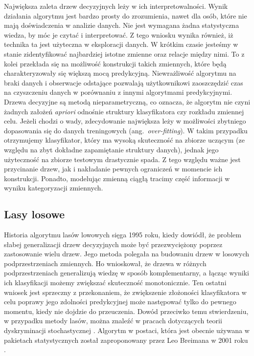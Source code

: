 \documentclass[12pt,a4paper,twoside,openany]{book}
\begin{document}
Największa zaleta drzew decyzyjnych leży w ich interpretowalności. Wynik działania algorytmu jest bardzo prosty do zrozumienia, nawet dla osób, które nie mają doświadczenia w analizie danych. Nie jest wymagana żadna statystyczna wiedza, by móc je czytać i interpretować. Z tego wniosku wynika również, iż technika ta jest użyteczna w eksploracji danych. W krótkim czasie jesteśmy w stanie zidentyfikować najbardziej istotne zmienne oraz relacje między nimi. To z kolei przekłada się na możliwość konstrukcji takich zmiennych, które będą charakteryzowały się większą mocą predykcyjną. Niewrażliwość algorytmu na braki danych i obserwacje odstające pozwalają użytkownikowi zaoszczędzić czas na czyszczeniu danych w porównaniu z innymi algorytmami predykcyjnymi. Drzewa decyzyjne są metodą nieparametryczną, co oznacza, że algorytm nie czyni żadnych założeń \textit{apriori} odnośnie struktury klasyfikatora czy rozkładu zmiennej celu. Jeżeli chodzi o wady, zdecydowanie największa leży w możliwości zbytniego dopasowania się do danych treningowych (ang.~\textit{over-fitting}).  W takim przypadku otrzymujemy klasyfikator, który ma wysoką skuteczność na zbiorze uczącym (ze względu na zbyt dokładne zapamiętanie struktury danych), jednak jego użyteczność na zbiorze testowym drastycznie spada. Z tego względu ważne jest przycinanie drzew, jak i nakładanie pewnych ograniczeń w momencie ich konstrukcji. Ponadto, modelując zmienną ciągłą tracimy część informacji w wyniku kategoryzacji zmiennych.


\subsection{Lasy losowe}

Historia algorytmu lasów lowowych sięga 1995 roku, kiedy \citet{ho1995} dowiódł, że problem słabej generalizacji drzew decyzyjnych może być przezwyciężony poprzez zastosowanie wielu drzew. Jego metoda polegała na budowaniu drzew w losowych podprzestrzeniach zmiennych. Ho wnioskował, że drzewa w różnych podprzestrzeniach generalizują wiedzę w sposób komplementarny, a łącząc wyniki ich klasyfikacji możemy zwiększać skuteczność monotonicznie. Ten ostatni wniosek jest sprzeczny z przekonaniem, że zwiększenie złożoności klasyfikatora w celu poprawy jego zdolności predykcyjnej może następować tylko do pewnego momentu, kiedy nie dojdzie do przeuczenia. Dowód przeciwko temu stwierdzeniu, w przypadku metody lasów, można znaleźć w pracach dotyczących teorii dyskryminacji stochastycznej \citep[][]{kleinberg1996, kleinberg2000}. Algorytm w postaci, która jest obecnie używana w pakietach statystycznych został zaproponowany przez Leo Breimana w 2001 roku \citep{breiman2001}.
\end{document}
